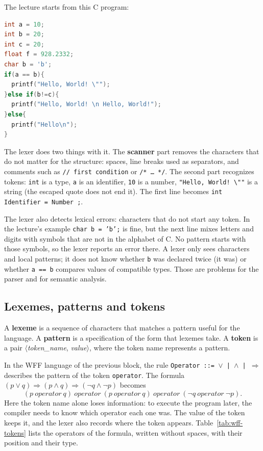 The lecture starts from this C program:
\begin{lstlisting}[language=C]
int a = 10;
int b = 20;
int c = 20;
float f = 928.2332;
char b = 'b';
if(a == b){
  printf("Hello, World! \"");
}else if(b!=c){
  printf("Hello, World! \n Hello, World!");
}else{
  printf("Hello\n");
}
\end{lstlisting}
The lexer does two things with it. The \textbf{scanner} part removes the
characters that do not matter for the structure: spaces, line breaks used as
separators, and comments such as \texttt{// first condition} or
\texttt{/* \dots{} */}. The second part recognizes tokens: \texttt{int} is a type,
\texttt{a} is an identifier, \texttt{10} is a number, \texttt{"Hello, World! \textbackslash""}
is a string (the escaped quote does not end it). The first line becomes
\texttt{int Identifier = Number ;}.

The lexer also detects lexical errors: characters that do not start any token.
In the lecture's example \texttt{char b = 'b';} is fine, but the next line mixes
letters and digits with symbols that are not in the alphabet of C. No pattern
starts with those symbols, so the lexer reports an error there. A lexer only sees characters and local patterns; it
does not know whether \texttt{b} was declared twice (it was) or whether
\texttt{a == b} compares values of compatible types. Those are problems for
the parser and for semantic analysis.

\subsection{Lexemes, patterns and tokens}

\begin{definition}
A \textbf{lexeme} is a sequence of characters that matches a pattern useful for
the language. A \textbf{pattern} is a specification of the form that lexemes
take. A \textbf{token} is a pair $\langle$\textit{token\_name}, \textit{value}$\rangle$,
where the token name represents a pattern.
\end{definition}

In the WFF language of the previous block, the rule
\texttt{Operator ::= $\vee$ | $\wedge$ | $\Rightarrow$} describes the pattern of the token
\texttt{operator}. The formula
$(p \vee q) \Rightarrow (p \wedge q) \Rightarrow (\neg q \wedge \neg p)$
becomes
\[
(p\ \mathit{operator}\ q)\ \mathit{operator}\ (p\ \mathit{operator}\ q)\ \mathit{operator}\ (\neg q\ \mathit{operator}\ \neg p).
\]
Here the token name alone loses information: to execute the program later,
the compiler needs to know which operator each one was. The value of the
token keeps it, and the lexer also records where the token appears.
Table~\ref{tab:wff-tokens} lists the operators of the formula, written without
spaces, with their position and their type.

